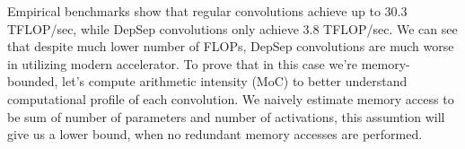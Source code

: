 
% 

% 

Empirical benchmarks show that regular convolutions achieve up to 30.3 TFLOP/sec, while DepSep convolutions only achieve 3.8 TFLOP/sec. We can see that despite much lower number of FLOPs, DepSep convolutions are much worse in utilizing modern accelerator. To prove that in this case we're memory-bounded, let's compute arithmetic intensity (MoC) to better understand computational profile of each convolution. We naively estimate memory access to be sum of number of parameters and number of activations, this assumtion will give us a lower bound, when no redundant memory accesses are performed. 


